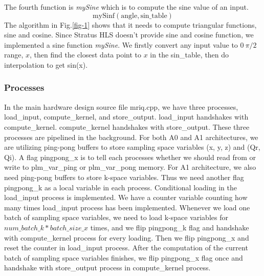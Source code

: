 \documentclass{sig-alternate}
\begin{document}
The fourth function is \textit{mySine} which is to compute the sine value of an input.
$$\mathrm{mySinf(angle, sin\_table)}$$
The algorithm in Fig.\ref{fig-1} shows that it needs to compute triangular functions, sine and cosine. Since Stratus HLS doesn't provide sine and cosine function, we implemented a sine function \textit{mySine}. We firstly convert any input value to $0~\pi/2$ range, $x$, then find the closest data point to $x$ in the sin\_table, then do interpolation to get sin(x). 
\\

\subsubsection{Processes}
In the main hardware design source file mriq.cpp, we have three processes, load\_input, compute\_kernel, and store\_output. load\_input handshakes with compute\_kernel. compute\_kernel handshakes with store\_output. These three processes are pipelined in the background. For both A0 and A1 architectures, we are utilizing ping-pong buffers to store sampling space variables (x, y, z) and (Qr, Qi). A flag pingpong\_x is to tell each processes whether we should read from or write to plm\_var\_ping or plm\_var\_pong memory. For A1 architecture, we also need ping-pong buffers to store k-space variables. Thus we need another flag pingpong\_k as a local variable in each process. Conditional loading in the load\_input process is implemented. We have a counter variable counting how many times load\_input process has been implemented. Whenever we load one batch of sampling space variables, we need to load k-space variables for $num\_batch\_k * batch\_size\_x$ times, and we flip pingpong\_k flag and handshake with compute\_kernel process for every loading. Then we flip pingpong\_x and reset the counter in load\_input process. After the computation of the current batch of sampling space variables finishes, we flip pingpong\_x flag once and handshake with store\_output process in compute\_kernel process. \\
\end{document}
